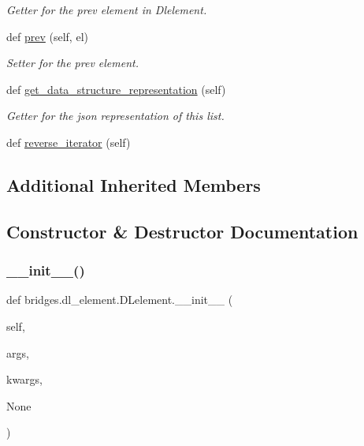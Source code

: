 \begin{DoxyCompactItemize}
\begin{DoxyCompactList}\small\item\em Getter for the prev element in Dlelement. \end{DoxyCompactList}\item 
def \hyperlink{classbridges_1_1dl__element_1_1_d_lelement_a17c371ec0c38e9555e55551d9be4d185}{prev} (self, el)
\begin{DoxyCompactList}\small\item\em Setter for the prev element. \end{DoxyCompactList}\item 
def \hyperlink{classbridges_1_1dl__element_1_1_d_lelement_abcae653ca8e9590c594910bad148ddf2}{get\+\_\+data\+\_\+structure\+\_\+representation} (self)
\begin{DoxyCompactList}\small\item\em Getter for the json representation of this list. \end{DoxyCompactList}\item 
def \hyperlink{classbridges_1_1dl__element_1_1_d_lelement_a2baa040819283ef3adcda70b630de421}{reverse\+\_\+iterator} (self)
\end{DoxyCompactItemize}
\subsection*{Additional Inherited Members}


\subsection{Constructor \& Destructor Documentation}
\mbox{\label{classbridges_1_1dl__element_1_1_d_lelement_a54256a7be5796b0471cb2655dd971bd5}} 
\subsubsection{\texorpdfstring{\+\_\+\+\_\+init\+\_\+\+\_\+()}{\_\_init\_\_()}}
{\footnotesize\ttfamily def bridges.\+dl\+\_\+element.\+D\+Lelement.\+\_\+\+\_\+init\+\_\+\+\_\+ (\begin{DoxyParamCaption}\item[{}]{self,  }\item[{}]{args,  }\item[{}]{kwargs,  }\item[{}]{None }\end{DoxyParamCaption})}



